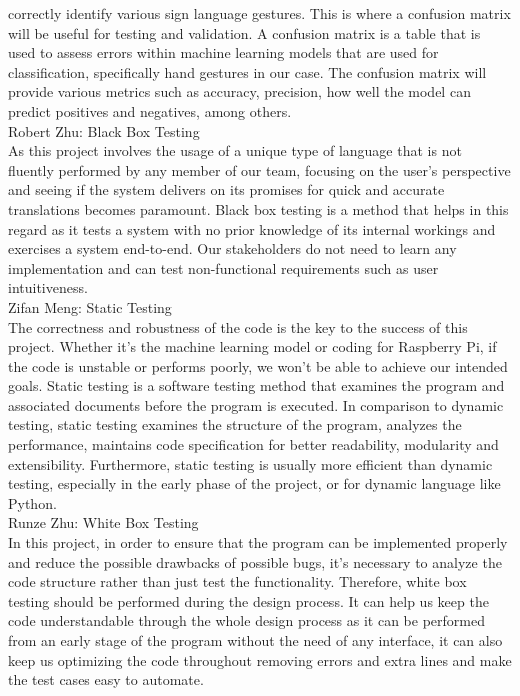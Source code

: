 \documentclass[12pt]{article}
\begin{document}
\begin{outline}[enumerate]
    correctly identify various sign language gestures. This is where a confusion matrix will be useful for testing and validation. A confusion matrix is a table that is 
    used to assess errors within machine learning models that are used for classification, specifically hand gestures in our case. The confusion matrix will provide
    various metrics such as accuracy, precision, how well the model can predict positives and negatives, among others.\\
    \2 Robert Zhu: Black Box Testing\\
    As this project involves the usage of a unique type of language that is not fluently performed by any member of our team, focusing on the user’s perspective and 
    seeing if the system delivers on its promises for quick and accurate translations becomes paramount. Black box testing is a method that helps in this regard as it tests 
    a system with no prior knowledge of its internal workings and exercises a system end-to-end. Our stakeholders do not need to learn any implementation and can test non-functional 
    requirements such as user intuitiveness.\\
    \2 Zifan Meng: Static Testing\\
    The correctness and robustness of the code is the key to the success of this project. Whether it's the machine learning model or coding for Raspberry Pi, if the code is unstable or performs poorly, we won't be able to achieve our intended goals. Static testing is a software testing method that examines the program and associated documents before the program is executed. In comparison to dynamic testing, static testing examines the structure of the program, analyzes the performance, maintains code specification for better readability, modularity and extensibility. Furthermore, static testing is usually more efficient than dynamic testing, especially in the early phase of the project, or for dynamic language like Python.\\
    \2 Runze Zhu: White Box Testing\\
    In this project, in order to ensure that the program can be implemented properly and reduce the possible drawbacks of possible bugs, it’s necessary to analyze the code structure rather than just test the functionality. Therefore, white box testing should be performed during the design process. It can help us keep the code understandable through the whole design process as it can be performed from an early stage of the program without the need of any interface, it can also keep us optimizing the code throughout removing errors and extra lines and make the test cases easy to automate.\\




\end{outline}
\end{document}
